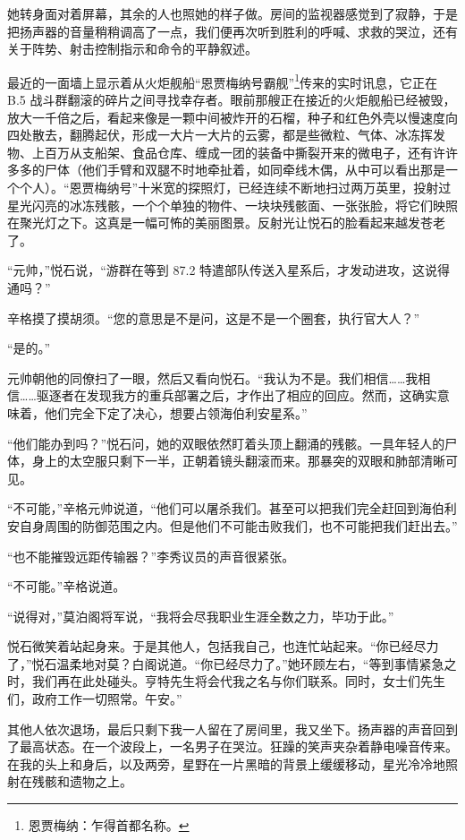 \documentclass[AutoFakeBold=true]{book}
\begin{document}
她转身面对着屏幕，其余的人也照她的样子做。房间的监视器感觉到了寂静，于是把扬声器的音量稍稍调高了一点，我们便再次听到胜利的呼喊、求救的哭泣，还有关于阵势、射击控制指示和命令的平静叙述。

最近的一面墙上显示着从火炬舰船``恩贾梅纳号霸舰''\footnote{恩贾梅纳：乍得首都名称。}传来的实时讯息，它正在 B.5 战斗群翻滚的碎片之间寻找幸存者。眼前那艘正在接近的火炬舰船已经被毁，放大一千倍之后，看起来像是一颗中间被炸开的石榴，种子和红色外壳以慢速度向四处散去，翻腾起伏，形成一大片一大片的云雾，都是些微粒、气体、冰冻挥发物、上百万从支船架、食品仓库、缠成一团的装备中撕裂开来的微电子，还有许许多多的尸体（他们手臂和双腿不时地牵扯着，如同牵线木偶，从中可以看出那是一个个人）。``恩贾梅纳号''十米宽的探照灯，已经连续不断地扫过两万英里，投射过星光闪亮的冰冻残骸，一个个单独的物件、一块块残骸面、一张张脸，将它们映照在聚光灯之下。这真是一幅可怖的美丽图景。反射光让悦石的脸看起来越发苍老了。

``元帅，''悦石说，``游群在等到 87.2 特遣部队传送入星系后，才发动进攻，这说得通吗？''

辛格摸了摸胡须。``您的意思是不是问，这是不是一个圈套，执行官大人？''

``是的。''

元帅朝他的同僚扫了一眼，然后又看向悦石。``我认为不是。我们相信……我相信……驱逐者在发现我方的重兵部署之后，才作出了相应的回应。然而，这确实意味着，他们完全下定了决心，想要占领海伯利安星系。''

``他们能办到吗？''悦石问，她的双眼依然盯着头顶上翻涌的残骸。一具年轻人的尸体，身上的太空服只剩下一半，正朝着镜头翻滚而来。那暴突的双眼和肺部清晰可见。

``不可能，''辛格元帅说道，``他们可以屠杀我们。甚至可以把我们完全赶回到海伯利安自身周围的防御范围之内。但是他们不可能击败我们，也不可能把我们赶出去。''

``也不能摧毁远距传输器？''李秀议员的声音很紧张。

``不可能。''辛格说道。

``说得对，''莫泊阁将军说，``我将会尽我职业生涯全数之力，毕功于此。''

悦石微笑着站起身来。于是其他人，包括我自己，也连忙站起来。``你已经尽力了，''悦石温柔地对莫？白阁说道。``你已经尽力了。''她环顾左右，``等到事情紧急之时，我们再在此处碰头。亨特先生将会代我之名与你们联系。同时，女士们先生们，政府工作一切照常。午安。''

其他人依次退场，最后只剩下我一人留在了房间里，我又坐下。扬声器的声音回到了最高状态。在一个波段上，一名男子在哭泣。狂躁的笑声夹杂着静电噪音传来。在我的头上和身后，以及两旁，星野在一片黑暗的背景上缓缓移动，星光冷冷地照射在残骸和遗物之上。
\end{document}
